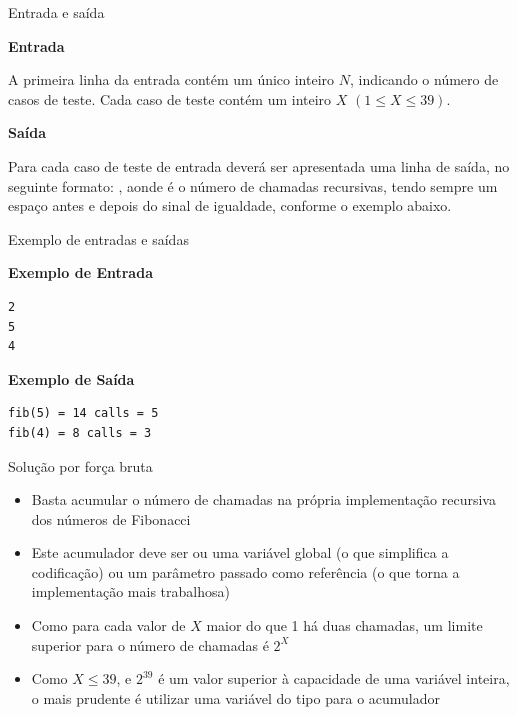 \begin{frame}[fragile]{Entrada e saída}

\textbf{Entrada}

A primeira linha da entrada contém um único inteiro $N$, indicando o número de casos de teste. 
Cada caso de teste contém um inteiro $X$ $(1 \leq X \leq 39)$.

\textbf{Saída}

Para cada caso de teste de entrada deverá ser apresentada uma linha de saída, no seguinte formato: 
 , aonde  é o número de chamadas 
recursivas, tendo sempre um espaço antes e depois do sinal de igualdade, conforme o exemplo abaixo.

\end{frame}

\begin{frame}[fragile]{Exemplo de entradas e saídas}

\begin{minipage}[t]{0.5\textwidth}
\textbf{Exemplo de Entrada}
\begin{verbatim}
2
5
4
\end{verbatim}
\end{minipage}
\begin{minipage}[t]{0.45\textwidth}
\textbf{Exemplo de Saída}
\begin{verbatim}
fib(5) = 14 calls = 5
fib(4) = 8 calls = 3
\end{verbatim}
\end{minipage}
\end{frame}

\begin{frame}[fragile]{Solução por força bruta}

    \begin{itemize}
        \item Basta acumular o número de chamadas na própria implementação recursiva dos
            números de Fibonacci

        \item Este acumulador deve ser ou uma variável global (o que simplifica a codificação)
            ou um parâmetro passado como referência (o que torna a implementação mais trabalhosa)

        \item Como para cada valor de $X$ maior do que 1 há duas chamadas, um limite superior
            para o número de chamadas é $2^X$

        \item Como $X\leq 39$, e $2^{39}$ é um valor superior à capacidade de uma variável inteira,
            o mais prudente é utilizar uma variável do tipo  para o 
            acumulador
   \end{itemize}

\end{frame}


